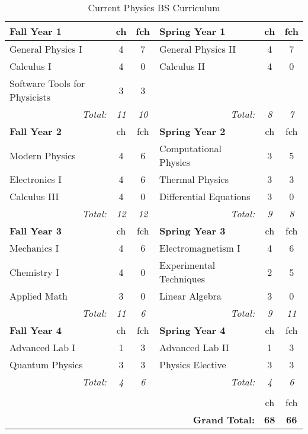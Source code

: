 \documentclass[12pt,preprint]{aastex}
\begin{document}
\newpage
\begin{longtable}{lcclcc}
\caption{Current Physics BS Curriculum}\label{table:currentbs} \\   
\hline
{\bf Fall Year 1} & {\sc ch} & {\sc fch} & {\bf Spring Year 1} & {\sc ch} & {\sc fch} \\
\hline
\hline
General Physics I             & 4 & 7 & General Physics II        & 4 & 7 \\
Calculus I                    & 4 & 0 & Calculus II                & 4 & 0  \\
Software Tools for Physicists & 3 & 3 &                            &   &    \\
\multicolumn{1}{r}{\emph{Total:}} & \emph{11} & \emph{10} &
\multicolumn{1}{r}{\emph{Total:}} & \emph{8}  & \emph{7} \\

\hline
{\bf Fall Year 2} & {\sc ch} & {\sc fch} & {\bf Spring Year 2} & {\sc ch} & {\sc fch} \\
\hline
\hline
Modern Physics & 4 & 6 & Computational Physics  & 3 & 5 \\
Electronics I  & 4 & 6 & Thermal Physics        & 3 & 3 \\
Calculus III   & 4 & 0 & Differential Equations & 3 & 0 \\
\multicolumn{1}{r}{\emph{Total:}} & \emph{12} & \emph{12} & 
\multicolumn{1}{r}{\emph{Total:}} & \emph{9}  & \emph{8}  \\ 

\hline
{\bf Fall Year 3} & {\sc ch} & {\sc fch} & {\bf Spring Year 3} & {\sc ch} & {\sc fch}  \\
\hline
\hline
Mechanics I  & 4 & 6 & Electromagnetism I      & 4 & 6 \\
Chemistry I  & 4 & 0 & Experimental Techniques & 2 & 5 \\
Applied Math & 3 & 0 & Linear Algebra          & 3 & 0 \\
\multicolumn{1}{r}{\emph{Total:}} & \emph{11} & \emph{6} &
\multicolumn{1}{r}{\emph{Total:}} & \emph{9} & \emph{11} \\  

\hline
{\bf Fall Year 4} & {\sc ch} & {\sc fch} &  {\bf Spring Year 4} & {\sc ch} & {\sc fch} \\
\hline
\hline
Advanced Lab I  & 1 & 3 & Advanced Lab II  & 1 & 3 \\
Quantum Physics & 3 & 3 & Physics Elective & 3 & 3 \\
\multicolumn{1}{r}{\emph{Total:}} & \emph{4} & \emph{6} &
\multicolumn{1}{r}{\emph{Total:}} & \emph{4} & \emph{6} \\
\hline \\
 &   &   &  & {\sc ch} & {\sc fch} \\  
 &   &   & \multicolumn{1}{r}{{\bf Grand Total:}} & {\bf 68} & {\bf 66} \\  
\end{longtable}
\end{document}
